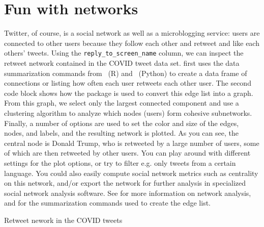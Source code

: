 

\section{Fun with networks}

Twitter, of course, is a social network as well as a microblogging service:
users are connected to other users because they follow each other and retweet and like each others' tweets.
Using the \verb+reply_to_screen_name+ column, we can inspect the retweet network contained in the COVID tweet data set.
 first uses the data summarization commands from \tidyverse\ (R) and \pandas\ (Python) to
create a data frame of connections or  listing how often each user retweets each other user.
The second code block shows how the  package is used to convert this edge list into a graph.
From this graph, we select only the largest connected component and use a clustering algorithm to analyze which
nodes (users) form cohesive subnetworks.
Finally, a number of options are used to set the color and size of the edges, nodes, and labels,
and the resulting network is plotted.
As you can see, the central node is Donald Trump, who is retweeted by a large number of users,
some of which are then retweeted by other users.
You can play around with different settings for the plot options,
or try to filter e.g. only tweets from a certain language. 
You could also easily compute social network metrics such as centrality on this network,
and/or export the network for further analysis in specialized social network analysis software.
See  for more information on network analysis,
and  for the summarization commands used to create the edge list.

\begin{ccsexample}
\caption{Retweet nework in the COVID tweets}\label{ex:fungraph}
\end{ccsexample}

